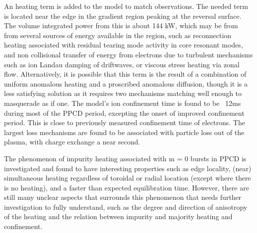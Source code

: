 \begin{refsection}

An \adhoc heating term is added to the model to match observations. The needed \adhoc term is located near the edge in the gradient region peaking at the reversal surface. The volume integrated \adhoc power from this is about 144 kW, which may be from from several sources of energy available in the region, such as reconnection heating associated with residual tearing mode activity in core resonant modes, and non collisional transfer of energy from electrons due to turbulent mechanisms such as ion Landau damping of driftwaves, or viscous stress heating via zonal flow. Alternatively, it is possible that this \adhoc term is the result of a combination of uniform anomalous heating and a proscribed anomalous diffusion, though it is a less satisfying solution as it requires two mechanisms matching well enough to masquerade as if one. The model's ion confinement time is found to be ~12ms during most of the PPCD period, excepting the onset of improved confinement period. This is close to previously measured confinement time of electrons. The largest loss mechanisms are found to be associated with particle loss out of the plasma, with charge exchange a near second. 

The phenomenon of impurity heating associated with m = 0 bursts in PPCD is investigated and found to have interesting properties such as edge locality, (near) simultaneous heating regardless of toroidal or radial location (except where there is no heating), and a faster than expected equilibration time. However, there are still many unclear aspects that surrounds this phenomenon that needs further investigation to fully understand, such as the degree and direction of anisotropy of the heating and the relation between impurity and majority heating and confinement. 


\end{refsection}
